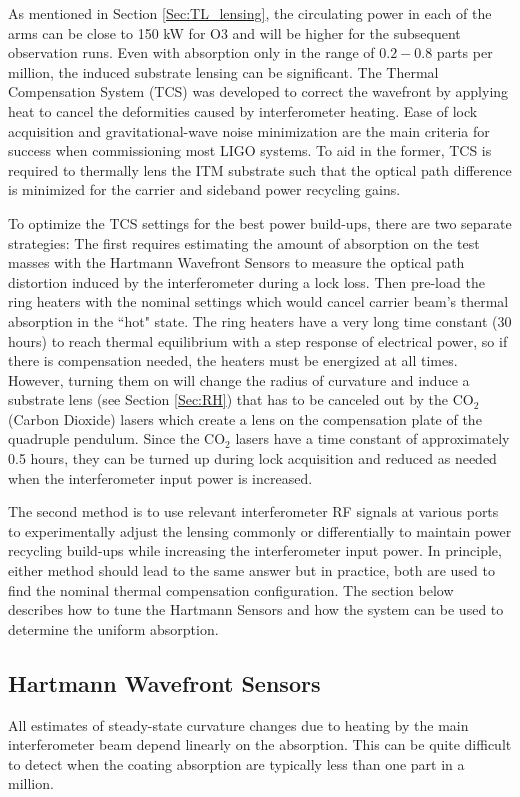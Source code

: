 	As mentioned in Section \ref{Sec:TL_lensing}, the circulating power in each of the arms can be close to 150 kW for O3 and will be higher for the subsequent observation runs.  Even with absorption only in the range of $0.2-0.8$ parts per million, the induced substrate lensing can be significant.  The Thermal Compensation System (TCS) \cite{Lawrence_TCS} \cite{AWC_current} \cite{winkler_thermaldist} \cite{Strain_TL} was developed to correct the wavefront by applying heat to cancel the deformities caused by interferometer heating.  Ease of lock acquisition and gravitational-wave noise minimization are the main criteria for success when commissioning most LIGO systems.  To aid in the former, TCS is required to thermally lens the ITM substrate such that the optical path difference is minimized for the carrier and sideband power recycling gains.
	
	To optimize the TCS settings for the best power build-ups, there are two separate strategies:  The first requires estimating the amount of absorption on the test masses with the Hartmann Wavefront Sensors to measure the optical path distortion induced by the interferometer during a lock loss.  Then pre-load the ring heaters with the nominal settings which would cancel carrier beam's thermal absorption in the ``hot" state.  The ring heaters have a very long time constant (30 hours) to reach thermal equilibrium with a step response of electrical power, so if there is compensation needed, the heaters must be energized at all times.    However, turning them on will change the radius of curvature and induce a substrate lens (see Section \ref{Sec:RH}) that has to be canceled out by the CO$_2$ (Carbon Dioxide) lasers which create a lens on the compensation plate of the quadruple pendulum.  Since the CO$_2$ lasers have a time constant of approximately 0.5 hours, they can be turned up during lock acquisition and reduced as needed when the interferometer input power is increased.
	
	The second method is to use relevant interferometer RF signals at various ports to experimentally adjust the lensing commonly or differentially to maintain power recycling build-ups while increasing the interferometer input power.  In principle, either method should lead to the same answer but in practice, both are used to find the nominal thermal compensation configuration.  The section below describes how to tune the Hartmann Sensors and how the system can be used to determine the uniform absorption. 
	\subsection{Hartmann Wavefront Sensors}\label{Sec:HWS}
	All estimates of steady-state curvature changes due to heating by the main interferometer beam depend linearly on the absorption. This can be quite difficult to detect when the coating absorption are typically less than one part in a million.
	
